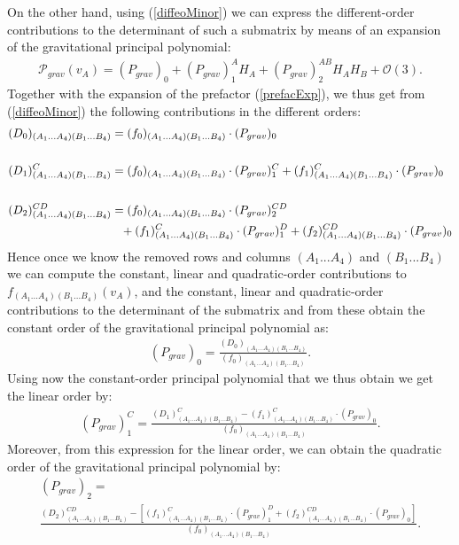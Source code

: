 On the other hand, using (\ref{diffeoMinor}) we can express the different-order contributions to the determinant of such a submatrix by means of an expansion of the gravitational principal polynomial:
\begin{align}
    \mathcal{P}_{grav}(v_A) = (P_{grav})_{0} + (P_{grav})^A_1 H_A+ (P_{grav})^{AB}_2 H_A H_B +\mathcal{O}(3).
\end{align}
Together with the expansion of the prefactor (\ref{prefacExp}), we thus get from (\ref{diffeoMinor}) the following contributions in the different orders:
\begin{align}\label{minorPoly}
    \begin{aligned}
    (D_0)_{(A_1...A_4)(B_1...B_4)}  &= (f_0)_{(A_1...A_4)(B_1...B_4)} \cdot (P_{grav})_0 \\
    \\
    (D_1)^C_{(A_1...A_4)(B_1...B_4)}  &= (f_0)_{(A_1...A_4)(B_1...B_4)} \cdot (P_{grav})^C_1 + (f_1)^C_{(A_1...A_4)(B_1...B_4)} \cdot (P_{grav})_0  \\
    \\
    (D_2)^{CD}_{(A_1...A_4)(B_1...B_4)}  &=  (f_0)_{(A_1...A_4)(B_1...B_4)} \cdot (P_{grav})_2^{CD} \\
     & \hphantom{=} +
     (f_1)^C_{(A_1...A_4)(B_1...B_4)} \cdot (P_{grav})_1^D +(f_2)^{CD}_{(A_1...A_4)(B_1...B_4)} \cdot (P_{grav})_0 
    \end{aligned}
\end{align}
Hence once we know the removed rows and columns $(A_1...A_4)$ and $(B_1...B_4)$ we can compute the constant, linear and quadratic-order contributions to $f_{(A_1...A_4)(B_1...B_4)}(v_A)$, and the constant, linear and quadratic-order contributions to the determinant of the submatrix and from these obtain the constant order of the gravitational principal polynomial as:
\begin{align}\label{POLY1}
(P_{grav})_0 = \frac{(D_0)_{(A_1...A_4)(B_1...B_4)}}{(f_0)_{(A_1...A_4)(B_1...B_4)}}.
\end{align}
Using now the constant-order principal polynomial that we thus obtain we get the linear order by:
\begin{align}\label{POLY2}
    (P_{grav})^C_1= \frac{(D_1)^C_{(A_1...A_4)(B_1...B_4)} - (f_1)^C_{(A_1...A_4)(B_1...B_4)} \cdot (P_{grav})_0}{(f_0)_{(A_1...A_4)(B_1...B_4)}}.
\end{align}
Moreover, from this expression for the linear order, we can obtain the quadratic order of the gravitational principal polynomial by:
\begin{multline}\label{POLY3}
    (P_{grav})_2 = \\
    \frac{(D_2)^{CD}_{(A_1...A_4)(B_1...B_4)}-\left [ (f_1)^C_{(A_1...A_4)(B_1...B_4)} \cdot (P_{grav})^D_1  +(f_2)^{CD}_{(A_1...A_4)(B_1...B_4)} \cdot (P_{grav})_0 \right ]}{(f_0)_{(A_1...A_4)(B_1...B_4)}}.
\end{multline}
